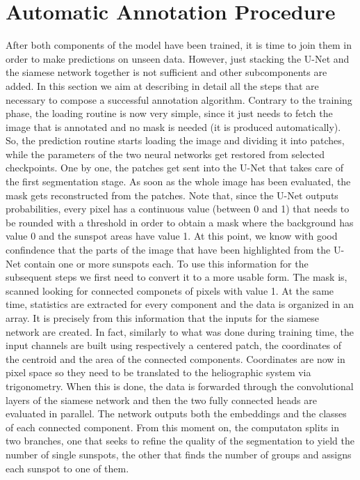 \section{Automatic Annotation Procedure}
\label{autoannotation}
After both components of the model have been trained, it is time to join them in order to make predictions on unseen data. However, just stacking the U-Net and the siamese network together is not sufficient and other subcomponents are added. In this section we aim at describing in detail all the steps that are necessary to compose a successful annotation algorithm.
\bigbreak
\noindent Contrary to the training phase, the loading routine is now very simple, since it just needs to fetch the image that is annotated and no mask is needed (it is produced automatically). So, the prediction routine starts loading the image and dividing it into patches, while the parameters of the two neural networks get restored from selected checkpoints. One by one, the patches get sent into the U-Net that takes care of the first segmentation stage. As soon as the whole image has been evaluated, the mask gets reconstructed from the patches. Note that, since the U-Net outputs probabilities, every pixel has a continuous value (between 0 and 1) that needs to be rounded with a threshold in order to obtain a mask where the background has value 0 and the sunspot areas have value 1.
\bigbreak
\noindent At this point, we know with good confindence that the parts of the image that have been highlighted from the U-Net contain one or more sunspots each. To use this information for the subsequent steps we first need to convert it to a more usable form. The mask is, scanned looking for connected componets of pixels with value 1. At the same time, statistics are extracted for every component and the data is organized in an array. It is precisely from this information that the inputs for the siamese network are created. In fact, similarly to what was done during training time, the input channels are built using respectively a centered patch, the coordinates of the centroid and the area of the connected components. Coordinates are now in pixel space so they need to be translated to the heliographic system via trigonometry. When this is done, the data is forwarded through the convolutional layers of the siamese network and then the two fully connected heads are evaluated in parallel. The network outputs both the embeddings and the classes of each connected component.
\bigbreak
\noindent From this moment on, the computaton splits in two branches, one that seeks to refine the quality of the segmentation to yield the number of single sunspots, the other that finds the number of groups and assigns each sunspot to one of them.
